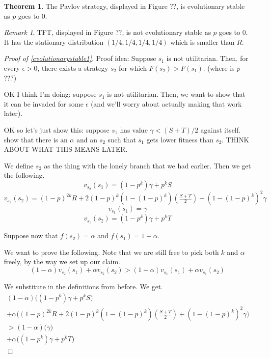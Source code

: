 \documentclass[11pt]{amsart}
\theoremstyle{definition}
\newtheorem{theorem}{Theorem}
\theoremstyle{remark}
\newtheorem*{remark}{Remark}
\begin{document}
\begin{theorem}
  The Pavlov strategy, displayed in Figure ??, is evolutionary stable as $p$ goes to 0.
\end{theorem}

\begin{remark}
  TFT, displayed in Figure ??, is not evolutionary stable as $p$ goes to 0. It has the stationary distribution $(1/4,1/4,1/4,1/4)$ which is smaller than $R$.
\end{remark}


\begin{proof}[Proof of \cref{evolutionarystable1}]
    Proof idea: Suppose $s_1$ is not utilitarian. Then, for every $\epsilon > 0$, there exists a strategy $s_2$ for which $F(s_2) > F(s_1)$. (where is $p$???)

    OK I think I'm doing: suppose $s_1$ is not utilitarian. Then, we want to show that it can be invaded for some $\epsilon$ (and we'll worry about actually making that work later).

    OK so let's just show this: suppose $s_1$ has value $\gamma < (S + T)/2$ against itself. show that there is an $\alpha$ and an $s_2$ such that $s_1$ gets lower fitness than $s_2$. THINK ABOUT WHAT THIS MEANS LATER.

    We define $s_2$ as the thing with the lonely branch that we had earlier. Then we get the following.
    \begin{equation}
      v_{s_2}(s_1) = (1 - p^k) \gamma  + p^k S
    \end{equation}
    \begin{equation}
      v_{s_2}(s_2) = (1-p)^{2k} R + 2 (1-p)^k (1 - (1-p)^k) (\tfrac{S + T}{2}) + (1 - (1-p)^k)^2 \gamma
    \end{equation}
    \begin{equation}
      v_{s_1}(s_1) = \gamma
    \end{equation}
    \begin{equation}
      v_{s_1}(s_2) = (1-p^k) \gamma + p^k T
    \end{equation}

    Suppose now that $f(s_2) = \alpha$ and $f(s_1) = 1 - \alpha$. 
    
    We want to prove the following. Note that we are still free to pick both $k$ and $\alpha$ freely, by the way we set up our claim. \begin{equation}
      (1- \alpha) v_{s_2}(s_1) + \alpha v_{s_2}(s_2) > (1-\alpha) v_{s_1}(s_1) + \alpha v_{s_1}(s_2)
    \end{equation}

    We substitute in the definitions from before. We get. \begin{multline}
      (1- \alpha) \big((1 - p^k) \gamma + p^k S\big) \\
      + \alpha \big( (1-p)^{2k} R + 2 (1-p)^k (1 - (1-p)^k) (\tfrac{S + T}{2}) + (1 - (1-p)^k)^2 \gamma \big) \\
      > (1-\alpha) \big(  \gamma \big) \\
      + \alpha \big(  (1-p^k) \gamma + p^k T  \big)
    \end{multline}

\end{proof}
\end{document}
